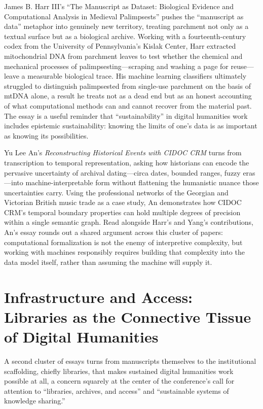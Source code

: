 \documentclass[final]{anthology-ch}  %
\begin{document}
James B. Harr III's \enquote{The Manuscript as Dataset: Biological Evidence and Computational Analysis in Medieval Palimpsests} pushes the \enquote{manuscript as data} metaphor into genuinely new territory, treating parchment not only as a textual surface but as a biological archive. Working with a fourteenth-century codex from the University of Pennsylvania's Kislak Center, Harr extracted mitochondrial DNA from parchment leaves to test whether the chemical and mechanical processes of palimpsesting---scraping and washing a page for reuse---leave a measurable biological trace. His machine learning classifiers ultimately struggled to distinguish palimpsested from single-use parchment on the basis of mtDNA alone, a result he treats not as a dead end but as an honest accounting of what computational methods can and cannot recover from the material past. The essay is a useful reminder that \enquote{sustainability} in digital humanities work includes epistemic sustainability: knowing the limits of one's data is as important as knowing its possibilities.

Yu Lee An's \textit{Reconstructing Historical Events with CIDOC CRM} turns from transcription to temporal representation, asking how historians can encode the pervasive uncertainty of archival dating---circa dates, bounded ranges, fuzzy eras---into machine-interpretable form without flattening the humanistic nuance those uncertainties carry. Using the professional networks of the Georgian and Victorian British music trade as a case study, An demonstrates how CIDOC CRM's temporal boundary properties can hold multiple degrees of precision within a single semantic graph. Read alongside Harr's and Yang's contributions, An's essay rounds out a shared argument across this cluster of papers: computational formalization is not the enemy of interpretive complexity, but working with machines responsibly requires building that complexity into the data model itself, rather than assuming the machine will supply it.

\section{Infrastructure and Access: Libraries as the Connective Tissue of Digital Humanities}

A second cluster of essays turns from manuscripts themselves to the institutional scaffolding, chiefly libraries, that makes sustained digital humanities work possible at all, a concern squarely at the center of the conference's call for attention to \enquote{libraries, archives, and access} and \enquote{sustainable systems of knowledge sharing.}
\end{document}
